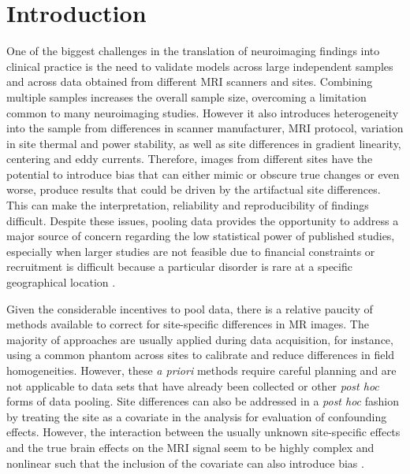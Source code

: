 \section{Introduction}
One of the biggest challenges in the translation of neuroimaging findings into clinical practice is the need to validate models across large independent samples and across data obtained from different MRI scanners and sites. Combining multiple samples increases the overall sample size, overcoming a limitation common to many neuroimaging studies. However it also introduces heterogeneity into the sample from differences in scanner manufacturer, MRI protocol, variation in site thermal and power stability, as well as site differences in gradient linearity, centering and eddy currents. Therefore, images from different sites have the potential to introduce bias that can either mimic or obscure true changes or even worse, produce results that could be driven by the artifactual site differences. This can make the interpretation, reliability and reproducibility of findings difficult. Despite these issues, pooling data provides the opportunity to address a major source of concern regarding the low statistical power of published studies, especially when larger studies are not feasible due to financial constraints or recruitment is difficult because a particular disorder is rare at a specific geographical location \citep{poldrack2014making}.

Given the considerable incentives to pool data, there is a relative paucity of methods available to correct for site-specific differences in MR images. The majority of approaches are usually applied during data acquisition, for instance, using a common phantom across sites to calibrate and reduce differences in field homogeneities. However, these \textit{a priori} methods require careful planning and are not applicable to data sets that have already been collected or other \textit{post hoc} forms of data pooling. Site differences can also be addressed in a \textit{post hoc} fashion by treating the site as a covariate in the analysis for evaluation of confounding effects. However, the interaction between the usually unknown site-specific effects and the true brain effects on the MRI signal seem to be highly complex and nonlinear such that the inclusion of the covariate can also introduce bias \citep{rao2017predictive}.

